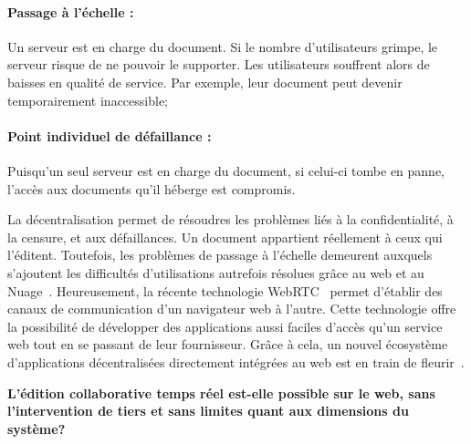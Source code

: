 \paragraph{Passage à l'échelle :} Un serveur est en charge du document. Si le
nombre d'utilisateurs grimpe, le serveur risque de ne pouvoir le supporter. Les
utilisateurs souffrent alors de baisses en qualité de service. Par exemple, leur
document peut devenir temporairement inaccessible;

\paragraph{Point individuel de défaillance :} Puisqu'un seul serveur est en
charge du document, si celui-ci tombe en panne, l'accès aux documents qu'il
héberge est compromis.
  

La décentralisation permet de résoudres les problèmes liés à la confidentialité,
à la censure, et aux défaillances. Un document appartient réellement à ceux qui
l'éditent. Toutefois, les problèmes de passage à l'échelle demeurent auxquels
s'ajoutent les difficultés d'utilisations autrefois résolues grâce au web et au
Nuage~\cite{mell2011national}. Heureusement, la récente technologie
WebRTC~\cite{webrtc} permet d'établir des canaux de communication d'un
navigateur web à l'autre. Cette technologie offre la possibilité de développer
des applications aussi faciles d'accès qu'un service web tout en se passant de
leur fournisseur. Grâce à cela, un nouvel écosystème d'applications
décentralisées directement intégrées au web est en train de
fleurir~\cite{webtorrent}.

\textbf{L'édition collaborative temps réel est-elle possible sur le web, sans
  l'intervention de tiers et sans limites quant aux dimensions du système?}





